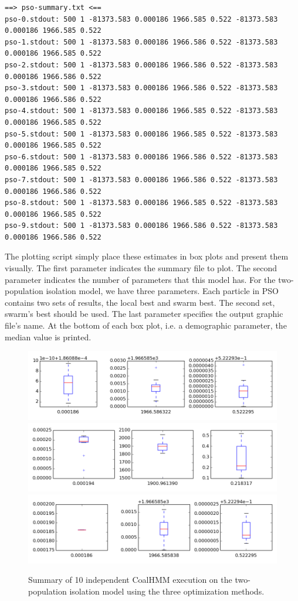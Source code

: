 \documentclass[graybox]{svmult}
\begin{document}
{\begin{verbatim}
==> pso-summary.txt <==
pso-0.stdout: 500 1 -81373.583 0.000186 1966.585 0.522 -81373.583 0.000186 1966.585 0.522
pso-1.stdout: 500 1 -81373.583 0.000186 1966.586 0.522 -81373.583 0.000186 1966.585 0.522
pso-2.stdout: 500 1 -81373.583 0.000186 1966.586 0.522 -81373.583 0.000186 1966.586 0.522
pso-3.stdout: 500 1 -81373.583 0.000186 1966.586 0.522 -81373.583 0.000186 1966.586 0.522
pso-4.stdout: 500 1 -81373.583 0.000186 1966.585 0.522 -81373.583 0.000186 1966.585 0.522
pso-5.stdout: 500 1 -81373.583 0.000186 1966.585 0.522 -81373.583 0.000186 1966.585 0.522
pso-6.stdout: 500 1 -81373.583 0.000186 1966.586 0.522 -81373.583 0.000186 1966.585 0.522
pso-7.stdout: 500 1 -81373.583 0.000186 1966.586 0.522 -81373.583 0.000186 1966.586 0.522
pso-8.stdout: 500 1 -81373.583 0.000186 1966.585 0.522 -81373.583 0.000186 1966.585 0.522
pso-9.stdout: 500 1 -81373.583 0.000186 1966.586 0.522 -81373.583 0.000186 1966.586 0.522
\end{verbatim}}

The plotting script simply place these estimates in box plots and present them visually.  The first parameter indicates the summary file to plot.  The second parameter indicates the number of parameters that this model has.  For the two-population isolation model, we have three parameters.  Each particle in PSO contains two sets of results, the local best and swarm best.  The second set, swarm's best should be used.  The last parameter specifies the output graphic file's name.  At the bottom of each box plot, i.e. a demographic parameter, the median value is printed.

\begin{figure}
\centering
\includegraphics[width=\textwidth]{images/nm-summary.png}
\includegraphics[width=\textwidth]{images/ga-summary.png}
\includegraphics[width=\textwidth]{images/pso-summary.png}
\caption{Summary of 10 independent CoalHMM execution on the two-population isolation model using the three optimization methods.}
\label{fig:est-summary}
\end{figure}
\end{document}

